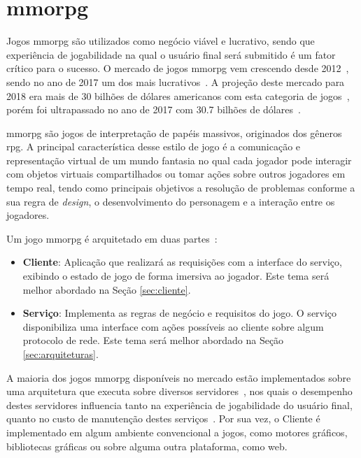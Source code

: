 \section{\ac{mmorpg}}
\label{sec:mmorpg}



Jogos \ac{mmorpg} são utilizados como negócio viável e lucrativo, sendo que experiência de jogabilidade na qual o usuário final será submitido é um fator crítico para o sucesso.
%
O mercado de jogos \ac{mmorpg} vem crescendo desde 2012~\cite{new_york_times}, sendo no ano de 2017 um dos mais lucrativos~\cite{statista_2018_mmo}.
%
A projeção deste mercado para 2018 era mais de 30 bilhões de dólares americanos com esta categoria de jogos~\cite{statista_2018}, porém foi ultrapassado no ano de 2017 com 30.7 bilhões de dólares~\cite{statista_2018_mmo}.



\ac{mmorpg} são jogos de interpretação de papéis massivos, originados dos gêneros \ac{rpg}.
%
A principal característica desse estilo de jogo é a comunicação e representação virtual de um mundo fantasia no qual cada jogador pode interagir com objetos virtuais compartilhados ou tomar ações sobre outros jogadores em tempo real, tendo como principais objetivos a resolução de problemas conforme a sua regra de \textit{design}, o desenvolvimento do personagem e a interação entre os jogadores\cite{video_game_technologies}.



Um jogo \ac{mmorpg} é arquitetado em duas partes~\cite{mmo_analytic}:
\begin{itemize}
  \item \textbf{Cliente}: Aplicação que realizará as requisições com a interface do serviço, exibindo o estado de jogo de forma imersiva ao jogador. Este tema será melhor abordado na Seção \ref{sec:cliente}.
  \item \textbf{Serviço}: Implementa as regras de negócio e requisitos do jogo. O serviço disponibiliza uma interface com ações possíveis ao cliente sobre algum protocolo de rede. Este tema será melhor abordado na Seção \ref{sec:arquiteturas}.
\end{itemize}



A maioria dos jogos \ac{mmorpg} disponíveis no mercado estão implementados sobre uma arquitetura que executa sobre diversos servidores~\cite{stephenclarkewillson2017}, nos quais o desempenho destes servidores influencia tanto na experiência de jogabilidade do usuário final, quanto no custo de manutenção destes serviços~\cite{1417630}.
%
Por sua vez, o Cliente é implementado em algum ambiente convencional a jogos, como motores gráficos, bibliotecas gráficas ou sobre alguma outra plataforma, como web.



